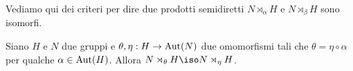 


Vediamo qui dei criteri per dire due prodotti semidiretti $N \rtimes_\alpha H$ e $N \rtimes_\beta H$ sono isomorfi. 

\begin{prop}\label{prop:IsoSemidiretti}
Siano $H$ e $N$ due gruppi e $\theta,\eta : H \to \mathrm{Aut}(N)$ due omomorfismi tali che $\theta=\eta \circ \alpha$ per qualche $\alpha \in \mathrm{Aut}(H)$. Allora $N \rtimes_\theta H \iso N \rtimes_\eta H$.
\end{prop}

